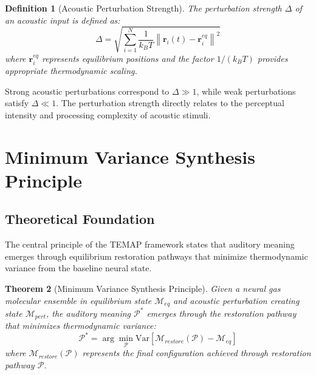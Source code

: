 \documentclass[12pt,a4paper]{article}
\newtheorem{theorem}{Theorem}[section]
\newtheorem{definition}[theorem]{Definition}
\begin{document}
\begin{definition}[Acoustic Perturbation Strength]
The perturbation strength $\Delta$ of an acoustic input is defined as:
\begin{equation}
\Delta = \sqrt{\sum_{i=1}^{N} \frac{1}{k_B T} \left\| \mathbf{r}_i(t) - \mathbf{r}_i^{eq} \right\|^2}
\end{equation}
where $\mathbf{r}_i^{eq}$ represents equilibrium positions and the factor $1/(k_B T)$ provides appropriate thermodynamic scaling.
\end{definition}

Strong acoustic perturbations correspond to $\Delta \gg 1$, while weak perturbations satisfy $\Delta \ll 1$. The perturbation strength directly relates to the perceptual intensity and processing complexity of acoustic stimuli.

\section{Minimum Variance Synthesis Principle}

\subsection{Theoretical Foundation}

The central principle of the TEMAP framework states that auditory meaning emerges through equilibrium restoration pathways that minimize thermodynamic variance from the baseline neural state.

\begin{theorem}[Minimum Variance Synthesis Principle]
Given a neural gas molecular ensemble in equilibrium state $\mathcal{M}_{eq}$ and acoustic perturbation creating state $\mathcal{M}_{pert}$, the auditory meaning $\mathcal{P}^*$ emerges through the restoration pathway that minimizes thermodynamic variance:
\begin{equation}
\mathcal{P}^* = \arg\min_{\mathcal{P}} \text{Var}\left[ \mathcal{M}_{restore}(\mathcal{P}) - \mathcal{M}_{eq} \right]
\end{equation}
where $\mathcal{M}_{restore}(\mathcal{P})$ represents the final configuration achieved through restoration pathway $\mathcal{P}$.
\end{theorem}
\end{document}
